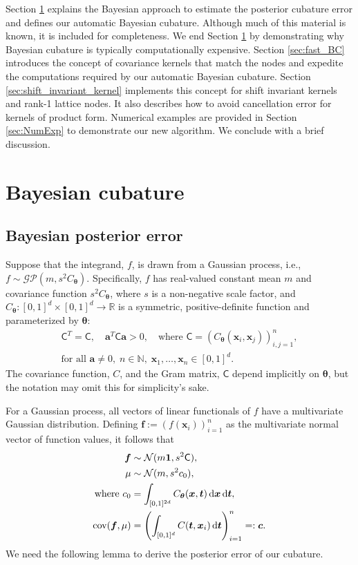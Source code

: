 \documentclass[twocolumn]{svjour3}          %
\newcommand{\bm}[1]{\boldsymbol{#1}}
\newcommand{\dif}[1]{\text{d}{#1}}
\newcommand{\D}[1]{\text{d}{#1}}
\newcommand{\vtheta}{{\bm{\theta}}}
\newcommand{\va}{\bm{a}}
\newcommand{\vc}{\bm{c}}
\newcommand{\vf}{\bm{f}}
\newcommand{\vt}{\bm{t}}
\newcommand{\vx}{\bm{x}}
\newcommand{\vone}{\bm{1}}
\newcommand{\mC}{\mathsf{C}}
\newcommand{\cov}{{\textup{cov}}}
\newcommand{\calN}{\mathcal{N}}
\begin{document}
Section \ref{sec:BC} explains the Bayesian approach to estimate the posterior cubature error and defines our automatic Bayesian cubature. Although much of this material is known, it is included for completeness.  We end Section \ref{sec:BC}  by demonstrating why Bayesian cubature is typically computationally expensive.
Section \ref{sec:fast_BC}  introduces the concept of covariance kernels that match the nodes and expedite the computations required by our automatic Bayesian cubature. 
Section \ref{sec:shift_invariant_kernel} implements this concept for shift invariant kernels and rank-1 lattice nodes.  It also describes how to avoid cancellation error for kernels of product form.  Numerical examples are provided in Section \ref{sec:NumExp} to demonstrate our new algorithm.  We conclude with a brief discussion.



\section{Bayesian cubature} \label{sec:BC} 


\subsection{Bayesian posterior error}
\label{sec:BayesPostErr}

Suppose that the integrand, $f$, is drawn from a Gaussian process, i.e., $f \sim \mathcal{GP}(m,s^2 C_\vtheta)$.  Specifically, $f$ has real-valued constant mean $m$ and covariance function $s^2C_\vtheta$, where $s$ is a non-negative scale factor, and $C_\vtheta: [0,1]^d \times [0,1]^d \to \mathbb{R} $ is a symmetric, positive-definite function and parameterized by $\vtheta$:
\begin{multline} \label{FJH:eq:CondPosDef}
\mC^T = \mC,  \quad \va^T \mC \va > 0, \quad \text{where }  \mC = \left(  C_\vtheta(\vx_i,\vx_j)  \right)_{i,j=1}^n,\\
 \text{for all } \va \ne 0, \;
 n\in \mathbb{N}, \; \vx_1, \ldots, \vx_n \in [0,1]^d.
\end{multline}
The covariance function, $C$, and the Gram matrix, $\mC$ depend implicitly on $\vtheta$, but the notation may omit this for simplicity's sake.

For a Gaussian process, all vectors of linear functionals of $f$ have a multivariate Gaussian distribution. Defining  $\vf  := \left( f(\vx_i)\right)_{i=1}^n$ as the multivariate normal vector of function values, it follows that 
\begin{subequations} \label{eqn:fGaussDist}
\begin{align}
\vf  & \sim \calN(m \vone, s^2 \mC), \\
\mu & \sim \calN(m, s^2 c_0), 
\\
\text{where }
c_0 &= \int_{[0,1]^{2d}} C_\vtheta(\vx,\vt) \, \dif{\vx} \, \dif{\vt}, \\
\cov(\vf, \mu) &= \left(  \int_{[0,1]^d} C(\vt,\vx_i) \, \D \vt \right)_{i=1}^n  =: \vc.
\end{align}
\end{subequations}
We need the following lemma to derive the posterior error of our cubature. 
\end{document}
